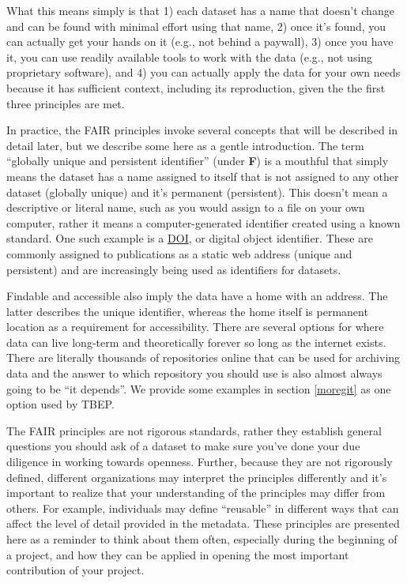 \documentclass[
]{book}
\begin{document}
What this means simply is that 1) each dataset has a name that doesn't change and can be found with minimal effort using that name, 2) once it's found, you can actually get your hands on it (e.g., not behind a paywall), 3) once you have it, you can use readily available tools to work with the data (e.g., not using proprietary software), and 4) you can actually apply the data for your own needs because it has sufficient context, including its reproduction, given the the first three principles are met.

In practice, the FAIR principles invoke several concepts that will be described in detail later, but we describe some here as a gentle introduction. The term ``globally unique and persistent identifier'' (under \textbf{F}) is a mouthful that simply means the dataset has a name assigned to itself that is not assigned to any other dataset (globally unique) and it's permanent (persistent). This doesn't mean a descriptive or literal name, such as you would assign to a file on your own computer, rather it means a computer-generated identifier created using a known standard. One such example is a \href{https://www.doi.org/}{DOI}, or digital object identifier. These are commonly assigned to publications as a static web address (unique and persistent) and are increasingly being used as identifiers for datasets.

Findable and accessible also imply the data have a home with an address. The latter describes the unique identifier, whereas the home itself is permanent location as a requirement for accessibility. There are several options for where data can live long-term and theoretically forever so long as the internet exists. There are literally thousands of repositories online that can be used for archiving data and the answer to which repository you should use is also almost always going to be ``it depends''. We provide some examples in section \ref{moregit} as one option used by TBEP.

The FAIR principles are not rigorous standards, rather they establish general questions you should ask of a dataset to make sure you've done your due diligence in working towards openness. Further, because they are not rigorously defined, different organizations may interpret the principles differently and it's important to realize that your understanding of the principles may differ from others. For example, individuals may define ``reusable'' in different ways that can affect the level of detail provided in the metadata. These principles are presented here as a reminder to think about them often, especially during the beginning of a project, and how they can be applied in opening the most important contribution of your project.
\end{document}
